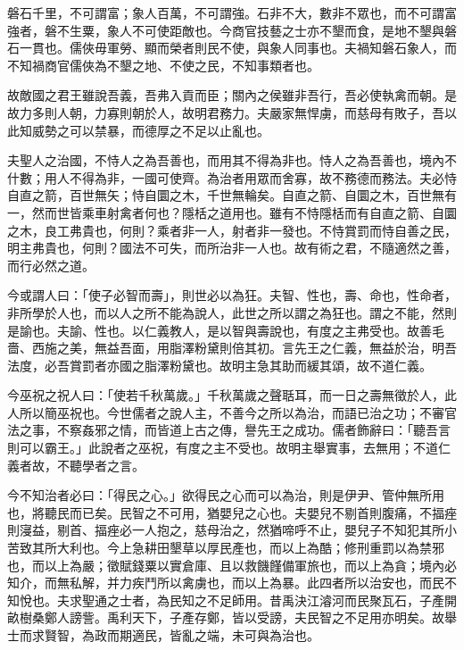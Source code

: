 \begin{pinyinscope}
磐石千里，不可謂富；象人百萬，不可謂強。石非不大，數非不眾也，而不可謂富強者，磐不生粟，象人不可使距敵也。今商官技藝之士亦不墾而食，是地不墾與磐石一貫也。儒俠毋軍勞、顯而榮者則民不使，與象人同事也。夫禍知磐石象人，而不知禍商官儒俠為不墾之地、不使之民，不知事類者也。

故敵國之君王雖說吾義，吾弗入貢而臣；關內之侯雖非吾行，吾必使執禽而朝。是故力多則人朝，力寡則朝於人，故明君務力。夫嚴家無悍虜，而慈母有敗子，吾以此知威勢之可以禁暴，而德厚之不足以止亂也。

夫聖人之治國，不恃人之為吾善也，而用其不得為非也。恃人之為吾善也，境內不什數；用人不得為非，一國可使齊。為治者用眾而舍寡，故不務德而務法。夫必恃自直之箭，百世無矢；恃自圜之木，千世無輪矣。自直之箭、自圜之木，百世無有一，然而世皆乘車射禽者何也？隱栝之道用也。雖有不恃隱栝而有自直之箭、自圜之木，良工弗貴也，何則？乘者非一人，射者非一發也。不恃賞罰而恃自善之民，明主弗貴也，何則？國法不可失，而所治非一人也。故有術之君，不隨適然之善，而行必然之道。

今或謂人曰：「使子必智而壽」，則世必以為狂。夫智、性也，壽、命也，性命者，非所學於人也，而以人之所不能為說人，此世之所以謂之為狂也。謂之不能，然則是諭也。夫諭、性也。以仁義教人，是以智與壽說也，有度之主弗受也。故善毛嗇、西施之美，無益吾面，用脂澤粉黛則倍其初。言先王之仁義，無益於治，明吾法度，必吾賞罰者亦國之脂澤粉黛也。故明主急其助而緩其頌，故不道仁義。

今巫祝之祝人曰：「使若千秋萬歲。」千秋萬歲之聲聒耳，而一日之壽無徵於人，此人所以簡巫祝也。今世儒者之說人主，不善今之所以為治，而語已治之功；不審官法之事，不察姦邪之情，而皆道上古之傳，譽先王之成功。儒者飾辭曰：「聽吾言則可以霸王。」此說者之巫祝，有度之主不受也。故明主舉實事，去無用；不道仁義者故，不聽學者之言。

今不知治者必曰：「得民之心。」欲得民之心而可以為治，則是伊尹、管仲無所用也，將聽民而已矣。民智之不可用，猶嬰兒之心也。夫嬰兒不剔首則腹痛，不揊痤則寖益，剔首、揊痤必一人抱之，慈母治之，然猶啼呼不止，嬰兒子不知犯其所小苦致其所大利也。今上急耕田墾草以厚民產也，而以上為酷；修刑重罰以為禁邪也，而以上為嚴；徵賦錢粟以實倉庫、且以救饑饉備軍旅也，而以上為貪；境內必知介，而無私解，并力疾鬥所以禽虜也，而以上為暴。此四者所以治安也，而民不知悅也。夫求聖通之士者，為民知之不足師用。昔禹決江濬河而民聚瓦石，子產開畝樹桑鄭人謗訾。禹利天下，子產存鄭，皆以受謗，夫民智之不足用亦明矣。故舉士而求賢智，為政而期適民，皆亂之端，未可與為治也。


\end{pinyinscope}